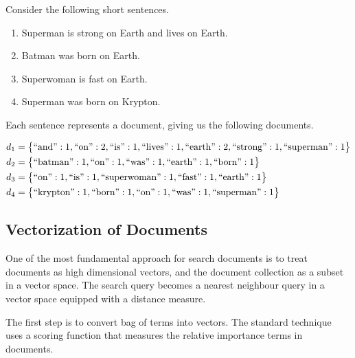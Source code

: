 	\begin{ex}
	\label{ex:superhero-documents}
		Consider the following short sentences.
		
		\begin{enumerate}
			\item Superman is strong on Earth and lives on Earth.
			\item Batman was born on Earth.
			\item Superwoman is fast on Earth.
			\item Superman was born on Krypton.
		\end{enumerate}
		
		Each sentence represents a document, giving us the following documents.
		
		\begin{align}
			d_1 &= \bigl\{\textrm{``and''}: 1, \textrm{``on''}: 2, \textrm{``is''}: 1, \textrm{``lives''}: 1, \textrm{``earth''}: 2, \textrm{``strong''}: 1, \textrm{``superman''}: 1\bigr\} \\
			d_2 &= \bigl\{\textrm{``batman''}: 1, \textrm{``on''}: 1, \textrm{``was''}: 1, \textrm{``earth''}: 1, \textrm{``born''}: 1\bigr\} \\
			d_3 &= \bigl\{\textrm{``on''}: 1, \textrm{``is''}: 1, \textrm{``superwoman''}: 1, \textrm{``fast''}: 1, \textrm{``earth''}: 1\bigr\} \\
			d_4 &= \bigl\{\textrm{``krypton''}: 1, \textrm{``born''}: 1, \textrm{``on''}: 1, \textrm{``was''}: 1, \textrm{``superman''}: 1\bigr\} \\
		\end{align}
	\end{ex}
	
	\subsection{Vectorization of Documents}
	\label{sec:vectorization-of-documents}
		One of the most fundamental approach for search documents is to treat documents as high dimensional vectors, and the document collection as a subset in a vector space.	 The search query becomes a nearest neighbour query in a vector space equipped with a distance measure.
		
		The first step is to convert bag of terms into vectors.	 The standard technique \cite{ir-08} uses a scoring function that measures the relative importance terms in documents.
		
